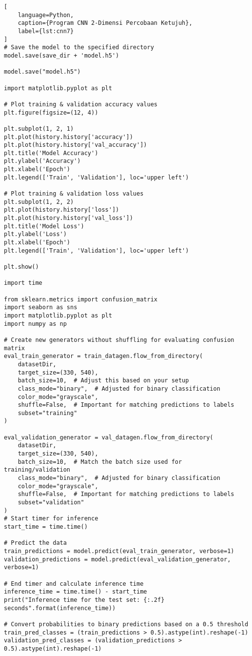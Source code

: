 \begin{lstlisting}[
    language=Python,
    caption={Program CNN 2-Dimensi Percobaan Ketujuh},
    label={lst:cnn7}
]
# Save the model to the specified directory
model.save(save_dir + 'model.h5')

model.save("model.h5")

import matplotlib.pyplot as plt

# Plot training & validation accuracy values
plt.figure(figsize=(12, 4))

plt.subplot(1, 2, 1)
plt.plot(history.history['accuracy'])
plt.plot(history.history['val_accuracy'])
plt.title('Model Accuracy')
plt.ylabel('Accuracy')
plt.xlabel('Epoch')
plt.legend(['Train', 'Validation'], loc='upper left')

# Plot training & validation loss values
plt.subplot(1, 2, 2)
plt.plot(history.history['loss'])
plt.plot(history.history['val_loss'])
plt.title('Model Loss')
plt.ylabel('Loss')
plt.xlabel('Epoch')
plt.legend(['Train', 'Validation'], loc='upper left')

plt.show()

import time

from sklearn.metrics import confusion_matrix
import seaborn as sns
import matplotlib.pyplot as plt
import numpy as np

# Create new generators without shuffling for evaluating confusion matrix
eval_train_generator = train_datagen.flow_from_directory(
    datasetDir,
    target_size=(330, 540),
    batch_size=10,  # Adjust this based on your setup
    class_mode="binary",  # Adjusted for binary classification
    color_mode="grayscale",
    shuffle=False,  # Important for matching predictions to labels
    subset="training"
)

eval_validation_generator = val_datagen.flow_from_directory(
    datasetDir,
    target_size=(330, 540),
    batch_size=10,  # Match the batch size used for training/validation
    class_mode="binary",  # Adjusted for binary classification
    color_mode="grayscale",
    shuffle=False,  # Important for matching predictions to labels
    subset="validation"
)
# Start timer for inference
start_time = time.time()

# Predict the data
train_predictions = model.predict(eval_train_generator, verbose=1)
validation_predictions = model.predict(eval_validation_generator, verbose=1)

# End timer and calculate inference time
inference_time = time.time() - start_time
print("Inference time for the test set: {:.2f} seconds".format(inference_time))

# Convert probabilities to binary predictions based on a 0.5 threshold
train_pred_classes = (train_predictions > 0.5).astype(int).reshape(-1)
validation_pred_classes = (validation_predictions > 0.5).astype(int).reshape(-1)


\end{lstlisting}
